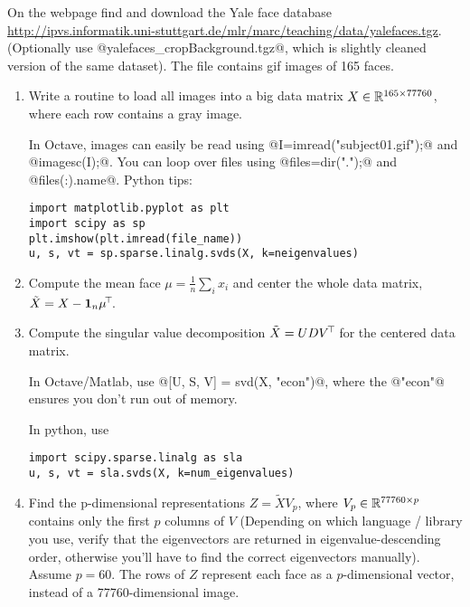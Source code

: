On the webpage find and download the Yale face database
{\tiny\url{http://ipvs.informatik.uni-stuttgart.de/mlr/marc/teaching/data/yalefaces.tgz}}.
(Optionally use @yalefaces_cropBackground.tgz@, which is slightly cleaned
version of the same dataset). The file contains gif images of 165 faces.

\begin{enumerate}
\item Write a routine to load all images into a big data matrix $X \in
{\mathbb{R}}^{165\times 77760}$, where each row contains a gray image.

In Octave, images can easily be read using
@I=imread("subject01.gif");@ and @imagesc(I);@. You can loop over
files using @files=dir(".");@ and @files(:).name@. Python tips:
\begin{code}
\begin{verbatim}
import matplotlib.pyplot as plt
import scipy as sp
plt.imshow(plt.imread(file_name))
u, s, vt = sp.sparse.linalg.svds(X, k=neigenvalues)
\end{verbatim}
\end{code}

\item Compute the mean face $\mu = \frac{1}{n} \sum_i x_i$ and center the whole
data matrix, $\tilde X = X - {{\bf 1}}_n \mu^{\!\top\!}$.

\item Compute the singular value decomposition $\tilde X = U D V^{\!\top\!}$ for the
centered data matrix.

In Octave/Matlab, use @[U, S, V] = svd(X, "econ")@, where the @"econ"@ ensures
you don't run out of memory.

In python, use 
\begin{code}
\begin{verbatim}
import scipy.sparse.linalg as sla 
u, s, vt = sla.svds(X, k=num_eigenvalues)
\end{verbatim}
\end{code}

\item Find the p-dimensional representations $Z = \tilde X V_p$, where $V_p \in
{\mathbb{R}}^{77760\times p}$ contains only the first $p$ columns of $V$ (Depending on
which language / library you use, verify that the eigenvectors are returned in
eigenvalue-descending order, otherwise you'll have to find the correct
eigenvectors manually). Assume $p=60$. The rows of $Z$ represent each face as a
$p$-dimensional vector, instead of a 77760-dimensional image.


\end{enumerate}
